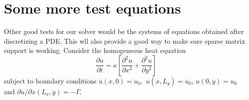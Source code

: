 \documentclass[10pt,a4paper]{article}
\newcommand{\bvec}[1]{\mathbf{#1}}
\begin{document}


\section{Some more test equations}
Other good tests for our solver would be the systems of equations obtained after discretizing a PDE. This wll also provide a good way to make sure sparse matrix support is working.
Consider the homogeneous heat equation
\begin{equation*}
  \frac{\partial u}{\partial t} = \kappa \left[ \frac{\partial^2u}{\partial x^2} + \frac{\partial^2 u}{\partial y^2}\right]
\end{equation*}
subject to boundary conditions $u(x, 0) = u_0,$ $u(x, L_y)=u_0$, $u(0, y) = u_0$ and $\partial u/\partial x(L_x, y) = -\Gamma.$
\end{document}
